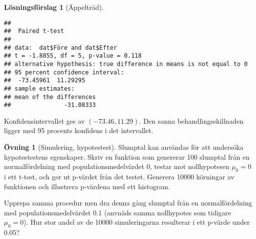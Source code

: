 \documentclass[
]{book}
\theoremstyle{definition}
\theoremstyle{definition}
\theoremstyle{definition}
\newtheorem{exercise}{Övning}[chapter]
\theoremstyle{definition}
\newtheorem{hypothesis}{Lösningsförslag}[chapter]
\theoremstyle{remark}
\begin{document}
\begin{hypothesis}[Äppelträd]
\begin{verbatim}
## 
##  Paired t-test
## 
## data:  dat$Före and dat$Efter
## t = -1.8855, df = 5, p-value = 0.118
## alternative hypothesis: true difference in means is not equal to 0
## 95 percent confidence interval:
##  -73.45961  11.29295
## sample estimates:
## mean of the differences 
##               -31.08333
\end{verbatim}

Konfidensintervallet ges av \((-73.46, 11.29)\). Den sanna behandlingsskillnaden ligger med 95 procents konfidens i det intervallet.
\end{hypothesis}

\begin{exercise}[Simulering, hypotestest]
Slumptal kan användas för att undersöka hypotestestens egenskaper. Skriv en funktion som genererar 100 slumptal från en normalfördelning med populationsmedelvärdet 0, testar mot nollhypotesen \(\mu_0 = 0\) i ett t-test, och ger ut p-värdet från det testet. Generera 10000 körningar av funktionen och illustrera p-värdena med ett histogram.

Upprepa samma procedur men dra denna gång slumptal från en normalfördelning med populationsmedelvärdet 0.1 (anvnäds samma nollhypotes som tidigare \(\mu_0 = 0\)). Hur stor andel av de 10000 simuleringarna resulterar i ett p-värde under 0.05?
\end{exercise}
\end{document}
